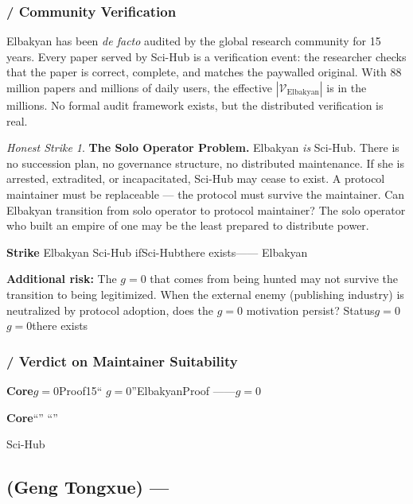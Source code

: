 \documentclass[12pt,a4paper]{article}
\theoremstyle{remark}
\newtheorem{honesthit}{Honest Strike}[section]
\newenvironment{hitbox}{%
  \begin{center}
  \color{critiquered}
  \begin{minipage}{0.92\textwidth}
  \begin{honesthit}
}{%
  \end{honesthit}
  \end{minipage}
  \end{center}
}
\begin{document}
\subsubsection{ / Community Verification}

Elbakyan has been \textit{de facto} audited by the global research community
for 15 years. Every paper served by Sci-Hub is a verification event: the
researcher checks that the paper is correct, complete, and matches the
paywalled original. With 88 million papers and millions of daily users, the
effective $|\mathcal{V}_{\text{Elbakyan}}|$ is in the millions. No formal
audit framework exists, but the distributed verification is real.

\begin{hitbox}
\textbf{The Solo Operator Problem.}
Elbakyan \textit{is} Sci-Hub. There is no succession plan, no governance
structure, no distributed maintenance. If she is arrested, extradited, or
incapacitated, Sci-Hub may cease to exist. A protocol maintainer must be
replaceable — the protocol must survive the maintainer. Can Elbakyan
transition from solo operator to protocol maintainer? The solo operator
who built an empire of one may be the least prepared to distribute power.

\textbf{Strike}
Elbakyan \textit{} Sci-Hub
ifSci-Hubthere exists——
Elbakyan


\textbf{Additional risk:} The $g=0$ that comes from being hunted may not
survive the transition to being legitimized. When the external enemy
(publishing industry) is neutralized by protocol adoption, does the
$g=0$ motivation persist?
\textbf{}Status$g=0$
$g=0$there exists
\end{hitbox}

\subsubsection{ / Verdict on Maintainer Suitability}

\begin{verdictbox}
\textbf{Core}$g=0$Proof15“
$g=0$”ElbakyanProof
——$g=0$

\textbf{Core}“”
“”


\textbf{}Sci-Hub

\end{verdictbox}

\newpage

\subsection{ (Geng Tongxue) — }
\end{document}

